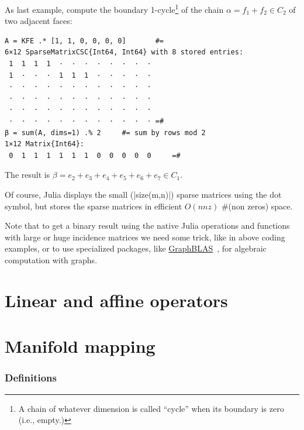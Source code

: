 \begin{coding}[Algebraic computation of FE = $\delta_1$]
\begin{coding} As last example, compute the boundary 1-cycle\footnote{A chain of whatever dimension is called “cycle” when its boundary is zero (i.e., empty.)} of the chain $\alpha = f_1 + f_2 \in C_2$ of two adjacent faces:
\begin{lstlisting}[language=JuliaLocal, style=julia, mathescape=true]
A = KFE .* [1, 1, 0, 0, 0, 0]		#=
6×12 SparseMatrixCSC{Int64, Int64} with 8 stored entries:
 1  1  1  1  ⋅  ⋅  ⋅  ⋅  ⋅  ⋅  ⋅  ⋅
 1  ⋅  ⋅  ⋅  1  1  1  ⋅  ⋅  ⋅  ⋅  ⋅
 ⋅  ⋅  ⋅  ⋅  ⋅  ⋅  ⋅  ⋅  ⋅  ⋅  ⋅  ⋅
 ⋅  ⋅  ⋅  ⋅  ⋅  ⋅  ⋅  ⋅  ⋅  ⋅  ⋅  ⋅
 ⋅  ⋅  ⋅  ⋅  ⋅  ⋅  ⋅  ⋅  ⋅  ⋅  ⋅  ⋅
 ⋅  ⋅  ⋅  ⋅  ⋅  ⋅  ⋅  ⋅  ⋅  ⋅  ⋅  ⋅	=#
β = sum(A, dims=1) .% 2 	#= sum by rows mod 2
1×12 Matrix{Int64}:
 0  1  1  1  1  1  1  0  0  0  0  0		=#
\end{lstlisting}
The result is $\beta = e_2+ e_3+ e_4+ e_5+ e_6+ e_7 \in C_1$. 
\end{coding}

\begin{remark} 
Of course, Julia displays the small (|size(m,n)|) sparse matrices using the dot symbol, but stores the sparse matrices in efficient $O(nnz)$ $\#$(non zeros) space.
\end{remark}
\begin{remark} 
Note that to get a binary result using the native Julia operations and functions with large or huge incidence matrices we need some trick, like in above coding examples, or to use specialized packages, like \href{https://github.com/GraphBLAS/GraphBLAS-Pointers}{GraphBLAS}~\cite{DBLP:conf/hpec/KepnerABBFGHKLM16}, for algebraic computation with graphs.
\end{remark}


\section{ Linear and affine operators}\label{sect:5-3}


\section{ Manifold mapping}\label{sect:5-4}


\subsubsection*{ Definitions}\label{sect:5-4-1}



\end{coding}
